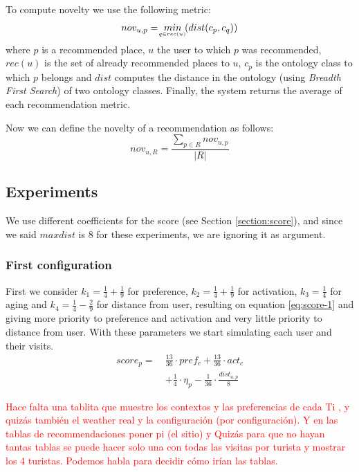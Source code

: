 To compute novelty \cite{kotkov2016survey} we use the following metric:
\begin{equation} \label{eq:novelty}
    nov_{u, p} = \  \underaccent{q \in rec(u)}{min} \  ( dist( c_p, c_q ) )
\end{equation}
where $p$ is a recommended place, $u$ the user to which $p$ was recommended, $rec(u)$ is the set of already recommended places to $u$, $c_p$ is the ontology class to which $p$ belongs and $dist$ computes the distance in the ontology (using \textit{Breadth First Search}) of two ontology classes. Finally, the system returns the average of each recommendation metric.

Now we can define the novelty of a recommendation as follows:
\begin{equation}
    nov_{u, R} = \frac{ \displaystyle \sum_{p \in R}{nov_{u, p}} }{| R |}
\end{equation}

\subsection{Experiments} \label{section:experiments}
We use different coefficients for the score (see Section \ref{section:score}), and since we said $maxdist$ is $8$ for these experiments, we are ignoring it as argument. 

\subsubsection{First configuration} \label{section:experiment-1}
First we consider $k_1 = \frac{1}{4} + \frac{1}{9}$ for preference, $k_2 = \frac{1}{4} + \frac{1}{9}$ for activation, $k_3 = \frac{1}{4}$ for aging and $k_4 = \frac{1}{4} - \frac{2}{9}$ for distance from user, resulting on equation \ref{eq:score-1} and giving more priority to preference and activation and very little priority to distance from user. With these parameters we start simulating each user and their visits.
\begin{equation} \label{eq:score-1}
    \begin{split}
        score_p = \ &\frac{13}{36} \cdot pref_c + \frac{13}{36} \cdot act_c \\
                                        &+ \frac{1}{4} \cdot \eta_p - \frac{1}{36} \cdot \frac{dist_{u,p}}{8}
    \end{split}
\end{equation}


\textcolor{red}{Hace falta una tablita que muestre los contextos y las preferencias de cada Ti , y quizás también el weather real y la configuración (por configuración).
Y en las tablas de recommendaciones poner pi (el sitio) y Quizás para que no hayan tantas tablas se puede hacer solo una con todas las visitas por turista y mostrar los 4 turistas. Podemos habla para decidir cómo irían las tablas.}


